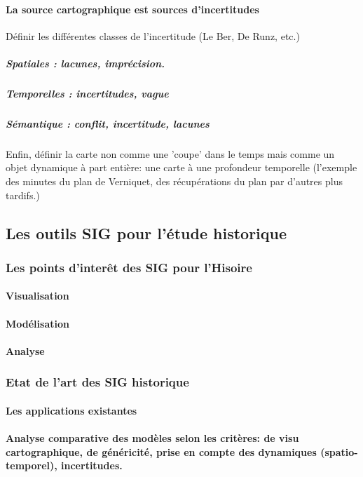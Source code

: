 \documentclass[a4paper,10pt]{article}
\begin{document}
\paragraph{La source cartographique est sources d'incertitudes}
Définir les différentes classes de l'incertitude (Le Ber, De Runz, etc.)
\subparagraph{Spatiales : lacunes, imprécision.}
\subparagraph{Temporelles : incertitudes, vague}
\subparagraph{Sémantique : conflit, incertitude, lacunes}

Enfin, définir la carte non comme une 'coupe' dans le temps mais comme un objet dynamique à part entière: une carte à 
une profondeur temporelle (l'exemple des minutes du plan de Verniquet, des récupérations du plan par d'autres plus tardifs.)

\subsection{Les outils SIG pour l'étude historique}

\subsubsection{Les points d'interêt des SIG pour l'Hisoire}
\paragraph{Visualisation}
\paragraph{Modélisation}
\paragraph{Analyse}

\subsubsection{Etat de l'art des SIG historique}
\paragraph{Les applications existantes}
\paragraph{Analyse comparative des modèles selon les critères: de visu cartographique, de généricité, prise en compte des dynamiques (spatio-temporel),
incertitudes.}
\end{document}
